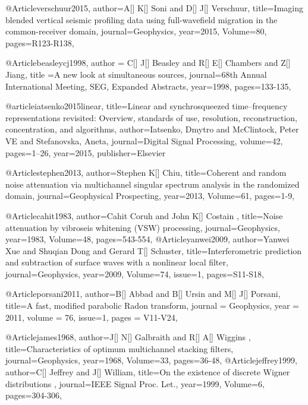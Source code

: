 {@Article{verschuur2015,
  author={A[] K[] Soni and D[] J[] Verschuur},
  title={Imaging blended vertical seismic profiling data using full-wavefield migration in the common-receiver domain},
  journal={Geophysics},
  year=2015,
  Volume=80,
  pages={R123-R138},
}


@Article{beasleycj1998,
  author = {C[] J[] Beasley and R[] E[] Chambers and Z[] Jiang},
  title ={A new look at simultaneous sources},
  journal={68th Annual International Meeting, SEG, Expanded Abstracts},
  year=1998,
  pages={133-135},
}

@article{iatsenko2015linear,
  title={Linear and synchrosqueezed time--frequency representations revisited: Overview, standards of use, resolution, reconstruction, concentration, and algorithms},
  author={Iatsenko, Dmytro and McClintock, Peter VE and Stefanovska, Aneta},
  journal={Digital Signal Processing},
  volume={42},
  pages={1--26},
  year={2015},
  publisher={Elsevier}
}


@Article{stephen2013,
  author={Stephen K[] Chiu},
  title={Coherent and random noise attenuation via multichannel singular spectrum analysis in the randomized domain},
  journal={Geophysical Prospecting},
  year=2013,
  Volume=61,
  pages={1-9},
}


@Article{cahit1983,
  author={Cahit Coruh and John K[] Costain },
  title={Noise attenuation by vibroseis whitening (VSW) processing},
  journal={Geophysics},
  year=1983,
  Volume=48,
  pages={543-554},
}
@Article{yanwei2009,
  author={Yanwei Xue and Shuqian Dong and Gerard T[] Schuster},
  title={Interferometric prediction and subtraction of surface waves with a nonlinear local filter},
  journal={Geophysics},
  year=2009,
  Volume=74,
  issue=1,
  pages={S11-S18},
}





@Article{porsani2011,
  author={B[] Abbad and B[] Ursin and M[] J[] Porsani},
  title={A fast, modified parabolic Radon transform},
  journal = 	 {Geophysics},
  year = 	 2011,
  volume =	 76,
  issue=1,
  pages =	 {V11-V24},
}



@Article{james1968,
  author={J[] N[] Galbraith and R[] A[] Wiggins },
  title={Characteristics of optimum multichannel stacking filters},
  journal={Geophysics},
  year=1968,
  Volume=33,
  pages={36-48},
}
@Article{jeffrey1999,
  author={C[] Jeffrey and J[] William},
  title={On the existence of discrete Wigner distributions
},
  journal={IEEE Signal Proc. Let.},
  year=1999,
  Volume=6,
  pages={304-306},
}

}
